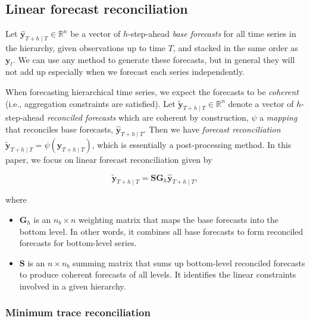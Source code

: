 \documentclass[11pt,a4paper,]{article}
\providecommand{\tightlist}{%
  \setlength{\itemsep}{0pt}\setlength{\parskip}{0pt}}
\begin{document}
\hypertarget{linear-forecast-reconciliation}{%
\subsection{Linear forecast
reconciliation}\label{linear-forecast-reconciliation}}

Let \(\hat{\boldsymbol{y}}_{T+h \mid T} \in \mathbb{R}^n\) be a vector
of \(h\)-step-ahead \emph{base forecasts} for all time series in the
hierarchy, given observations up to time \(T\), and stacked in the same
order as \(\boldsymbol{y}_t\). We can use any method to generate these
forecasts, but in general they will not add up especially when we
forecast each series independently.

When forecasting hierarchical time series, we expect the forecasts to be
\emph{coherent} (i.e., aggregation constraints are satisfied). Let
\(\tilde{\boldsymbol{y}}_{T+h \mid T} \in \mathbb{R}^n\) denote a vector
of \(h\)-step-ahead \emph{reconciled forecasts} which are coherent by
construction, \(\psi\) a \emph{mapping} that reconciles base forecasts,
\(\hat{\boldsymbol{y}}_{T+h \mid T}\). Then we have \emph{forecast
reconciliation}
\(\tilde{\boldsymbol{y}}_{T+h \mid T}=\psi(\hat{\boldsymbol{y}}_{T+h \mid T})\),
which is essentially a post-processing method. In this paper, we focus
on linear forecast reconciliation given by

\[
\tilde{\boldsymbol{y}}_{T+h \mid T} = \boldsymbol{S}\boldsymbol{G}_h\hat{\boldsymbol{y}}_{T+h \mid T},
\]

where

\begin{itemize}
\tightlist
\item
  \(\boldsymbol{G}_h\) is an \(n_b \times n\) weighting matrix that maps
  the base forecasts into the bottom level. In other words, it combines
  all base forecasts to form reconciled forecasts for bottom-level
  series.
\item
  \(\boldsymbol{S}\) is an \(n \times n_b\) summing matrix that sums up
  bottom-level reconciled forecasts to produce coherent forecasts of all
  levels. It identifies the linear constraints involved in a given
  hierarchy.
\end{itemize}

\hypertarget{minimum-trace-reconciliation}{%
\subsubsection{Minimum trace
reconciliation}\label{minimum-trace-reconciliation}}
\end{document}
